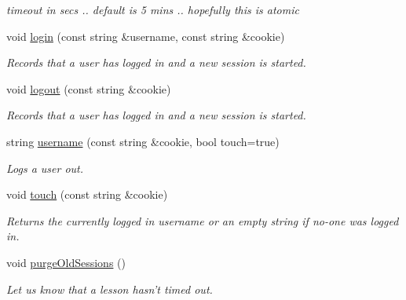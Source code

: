 \begin{DoxyCompactItemize}
\begin{DoxyCompactList}\small\item\em timeout in secs .. default is 5 mins .. hopefully this is atomic \item\end{DoxyCompactList}\item 
void \hyperlink{classwittyPlus_1_1MemorySessionStore_a4a1fe8b843bc8adb5509e46eca4ff120}{login} (const string \&username, const string \&cookie)
\begin{DoxyCompactList}\small\item\em Records that a user has logged in and a new session is started. \item\end{DoxyCompactList}\item 
void \hyperlink{classwittyPlus_1_1MemorySessionStore_aaf13cd412f361dd9a0f885b0d20233db}{logout} (const string \&cookie)
\begin{DoxyCompactList}\small\item\em Records that a user has logged in and a new session is started. \item\end{DoxyCompactList}\item 
string \hyperlink{classwittyPlus_1_1MemorySessionStore_a830959fdfbc95c6b61c13f7597857a15}{username} (const string \&cookie, bool touch=true)
\begin{DoxyCompactList}\small\item\em Logs a user out. \item\end{DoxyCompactList}\item 
void \hyperlink{classwittyPlus_1_1MemorySessionStore_a2015628d4b24583ef148ce153cd431fc}{touch} (const string \&cookie)
\begin{DoxyCompactList}\small\item\em Returns the currently logged in username or an empty string if no-\/one was logged in. \item\end{DoxyCompactList}\item 
void \hyperlink{classwittyPlus_1_1MemorySessionStore_aea2b4645a9d06add5c79b33b9ac8f21c}{purgeOldSessions} ()
\begin{DoxyCompactList}\small\item\em Let us know that a lesson hasn't timed out. \item\end{DoxyCompactList}\end{DoxyCompactItemize}
